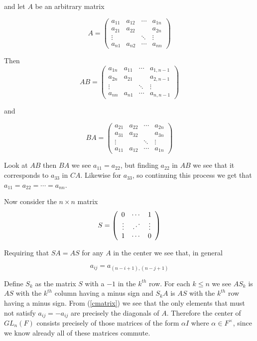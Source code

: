 \documentclass[11pt]{article}
\def\bddots{\mathinner{\mkern1mu\raise1pt\hbox{.}\mkern2mu
        \raise4pt\hbox{.}\mkern2mu\raise7pt\vbox{\kern7pt\hbox{.}}\mkern1mu}}
\begin{document}
\begin{enumerate}
and let $A$ be an arbitrary matrix 

\[A=
\left(
\begin{array}{cccc}
a_{11} & a_{12} & \cdots & a_{1n} \\
a_{21} & a_{22} &  & a_{2n} \\
\vdots & & \ddots & \vdots \\
a_{n1} & a_{n2} & \cdots & a_{nn}
\end{array}
\right)
\]

Then
\[AB =
\left(
\begin{array}{cccc}
a_{1n} & a_{11} & \cdots & a_{1,n-1} \\
a_{2n} & a_{21} & & a_{2,n-1} \\
\vdots & & \ddots & \vdots \\
a_{nn} & a_{n1} & \cdots & a_{n,n-1}
\end{array}
\right)
\]

and

\[BA =
\left(
\begin{array}{cccc}
a_{21} & a_{22} & \cdots & a_{2n} \\
a_{31} & a_{32} & & a_{3n} \\
\vdots & & \ddots & \vdots \\
a_{11} & a_{12} & \cdots & a_{1n}
\end{array}
\right)
\]

Look at $AB$ then $BA$ we see $a_{11} = a_{22}$, but finding $a_{22}$ in $AB$ we see that it corresponds to $a_{33}$ in $CA$.  Likewise for $a_{33}$, so continuing this process we get that $a_{11} = a_{22} = \cdots = a_{nn}$.

Now consider the $n \times n$ matrix
\[S=
\left(
\begin{array}{ccc}
0 & \cdots & 1 \\
\vdots & \bddots & \vdots \\
1 & \cdots & 0
\end{array}
\right)
\]

Requiring that $SA = AS$ for any $A$ in the center we see that, in general

\begin{equation}
\label{cmatrix}
a_{ij} = a_{(n-i+1),(n-j+1)}
\end{equation}  

Define $S_k$ as the matrix $S$ with a $-1$ in the $k^{th}$ row.  For each $k \leq n$ we see $AS_k$ is $AS$ with the $k^{th}$ column having a minus sign and $S_kA$ is $AS$ with the $k^{th}$ row having a minus sign.  From (\ref{cmatrix}) we see that the only elements that must not satisfy $a_{ij} = -a_{ij}$ are precisely the diagonals of $A$.  Therefore the center of $GL_n(F)$ consists precisely of those matrices of the form $\alpha I$ where $\alpha \in F^\times$, since we know already all of these matrices commute.


\end{enumerate}
\end{document}
